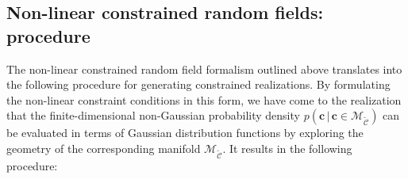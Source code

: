 \documentclass[a4paper, 11pt]{article}
\begin{document}
\bigskip
\subsection{Non-linear constrained random fields: procedure}
The non-linear constrained random field formalism outlined above translates into the following procedure for generating constrained realizations. By formulating the non-linear constraint conditions in this form, we have come to the realization that the finite-dimensional non-Gaussian probability density $p(\bm{c}\,|\,\bm{c}\in \mathcal{M}_{\mathcal{\tilde C}})$ can be evaluated in terms of Gaussian distribution functions by exploring the geometry of the corresponding manifold $\mathcal{M}_\mathcal{\tilde C}$. It results in the following procedure:
\end{document}
